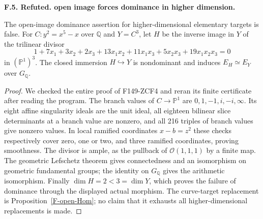 \documentclass[11pt,oneside]{article}
\makeatletter
\newcounter{statementanchor}
\newenvironment{statement}[3]{%
 \refstepcounter{statementanchor}\def\@currentlabel{#1}%
 \par\addvspace{9pt}\noindent
 \textbf{#1. #2. #3.}\par\nobreak\noindent\ignorespaces
}{\par\addvspace{5pt}}
\makeatother
\begin{document}
\begin{statement}{F.5}{Refuted}{open image forces dominance in higher dimension}
\label{st:F.5}
\label{F-hyperplane}
The open-image dominance assertion for higher-dimensional elementary
targets is false. For $C:y^2=x^5-x$ over $\mathbb Q$ and $Y=C^3$,
let $H$ be the inverse image in $Y$ of the trilinear divisor
\[
 1+7x_1+3x_2+2x_3+13x_1x_2+11x_1x_3
       +5x_2x_3+19x_1x_2x_3=0
\]
in $(\mathbb P^1)^3$. The closed immersion $H\hookrightarrow Y$
is nondominant and induces $E_H\simeq E_Y$ over $G_{\mathbb Q}$.
\end{statement}
\begin{proof}
We checked the entire proof of F149-ZCF4 and reran its finite
certificate after reading the program. The branch values of
$C\to\mathbb P^1$ are $0,1,-1,i,-i,\infty$. Its eight affine
singularity ideals are the unit ideal, all eighteen bilinear slice
determinants at a branch value are nonzero, and all 216 triples of
branch values give nonzero values. In local ramified coordinates
$x-b=z^2$ these checks respectively cover zero, one or two, and
three ramified coordinates, proving smoothness. The divisor is
ample, as the pullback of $\mathcal O(1,1,1)$ by a finite map.
The geometric Lefschetz theorem gives connectedness and an
isomorphism on geometric fundamental groups; the identity on
$G_{\mathbb Q}$ gives the arithmetic isomorphism. Finally
$\dim H=2<3=\dim Y$, which proves the failure of dominance through
the displayed actual morphism. The curve-target replacement is
Proposition~\ref{F-open-Hom}; no claim that it exhausts all
higher-dimensional replacements is made.
\end{proof}
\end{document}
